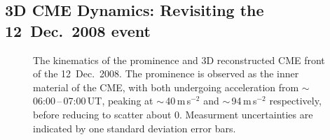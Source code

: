 \documentclass[preprint2]{aastex}
\begin{document}
\subsection{3D CME Dynamics: Revisiting the 12~Dec.~2008 event}

\begin{figure}[ht]
\caption{The kinematics of the prominence and 3D reconstructed CME front of the 12~Dec.~2008. The prominence is observed as the inner material of the CME, with both undergoing acceleration from $\sim$\,06:00\,--\,07:00\,UT, peaking at $\sim$\,40\,m\,s$^{-2}$ and $\sim$\,94\,m\,s$^{-2}$ respectively, before reducing to scatter about 0. Measurment uncertainties are indicated by one standard deviation error bars.}
\label{12dec2008kins}
\end{figure}
\end{document}
